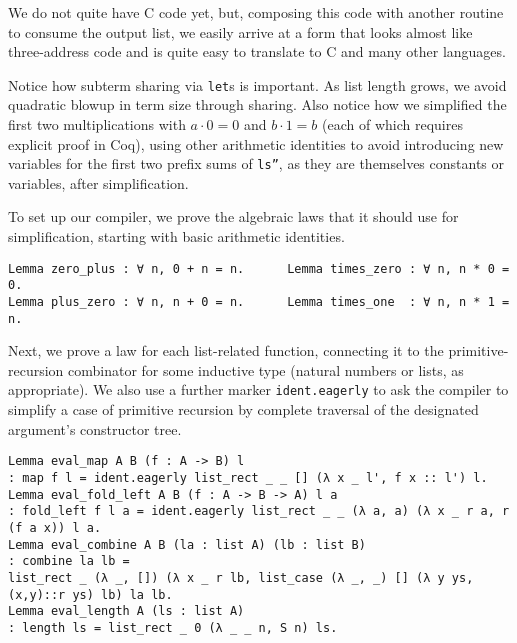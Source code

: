 \documentclass[a4paper,USenglish,cleveref,autoref,thm-restate]{lipics-v2021}
\newcommand{\todo}[1]{\textcolor{red}{\textbf{TODO: #1}}}
\begin{document}
We do not quite have C code yet, but, composing this code with another routine to consume the output list, we easily arrive at a form that looks almost like three-address code and is quite easy to translate to C and many other languages.

Notice how subterm sharing via \texttt{let}s is important.
As list length grows, we avoid quadratic blowup in term size through sharing.
Also notice how we simplified the first two multiplications with $a \cdot 0 = 0$ and $b \cdot 1 = b$ (each of which requires explicit proof in Coq), using other arithmetic identities to avoid introducing new variables for the first two prefix sums of \texttt{ls''}, as they are themselves constants or variables, after simplification.

To set up our compiler, we prove the algebraic laws that it should use for simplification, starting with basic arithmetic identities.
\begin{verbatim}
Lemma zero_plus : ∀ n, 0 + n = n.      Lemma times_zero : ∀ n, n * 0 = 0.
Lemma plus_zero : ∀ n, n + 0 = n.      Lemma times_one  : ∀ n, n * 1 = n.
\end{verbatim}

Next, we prove a law for each list-related function, connecting it to the primitive-recursion combinator for some inductive type (natural numbers or lists, as appropriate).
We also use a further marker \texttt{ident.eagerly} to ask the compiler to simplify a case of primitive recursion by complete traversal of the designated argument's constructor tree.
\begin{verbatim}
Lemma eval_map A B (f : A -> B) l
: map f l = ident.eagerly list_rect _ _ [] (λ x _ l', f x :: l') l.
Lemma eval_fold_left A B (f : A -> B -> A) l a
: fold_left f l a = ident.eagerly list_rect _ _ (λ a, a) (λ x _ r a, r (f a x)) l a.
Lemma eval_combine A B (la : list A) (lb : list B)
: combine la lb =
list_rect _ (λ _, []) (λ x _ r lb, list_case (λ _, _) [] (λ y ys, (x,y)::r ys) lb) la lb.
Lemma eval_length A (ls : list A)
: length ls = list_rect _ 0 (λ _ _ n, S n) ls.
\end{verbatim}
\end{document}

